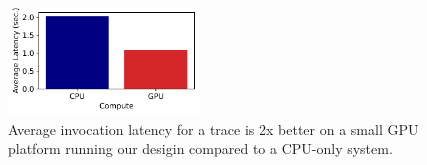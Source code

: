 
\begin{figure}
  \includegraphics[width=0.45\textwidth]{../graphs/cpu_compare/25.7/compute_compare_squish.pdf}
  \vspace*{\captionspace}
  \caption{Average invocation latency for a trace is 2x better on a small GPU platform running our desigin compared to a CPU-only system.}
    \label{fig:cpu-compare}
    \vspace{-0.6cm}
\end{figure}

